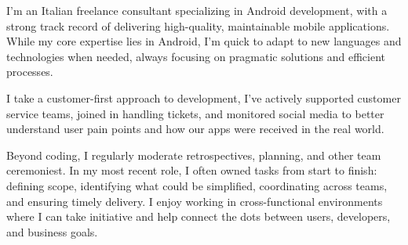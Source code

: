 

\begin{cvparagraph}


I’m an Italian freelance consultant specializing in Android development, with a strong track
record of delivering high-quality, maintainable mobile applications.
While my core expertise lies in Android, I’m quick to adapt to new languages and technologies when needed, always
focusing on pragmatic solutions and efficient processes.

I take a customer-first approach to development, I’ve actively supported
customer service teams, joined in handling tickets, and monitored social media to better understand
user pain points and how our apps were received in the real world.

Beyond coding, I regularly moderate retrospectives, planning, and other team ceremoniest.
In my most recent role, I often owned tasks from start to finish: defining scope, identifying
what could be simplified, coordinating across teams, and ensuring timely delivery.
I enjoy working in cross-functional environments where I can take initiative and help connect
the dots between users, developers, and business goals.
\end{cvparagraph}
